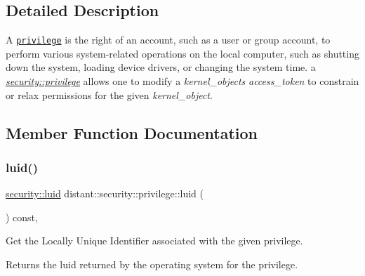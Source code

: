 \subsection{Detailed Description}
A \href{https://msdn.microsoft.com/en-us/library/windows/desktop/aa379306(v=vs.85).aspx}{\tt privilege} is the right of an account, such as a user or group account, to perform various system-\/related operations on the local computer, such as shutting down the system, loading device drivers, or changing the system time. a {\itshape \mbox{\hyperlink{classdistant_1_1security_1_1privilege}{security\+::privilege}}} allows one to modify a {\itshape kernel\+\_\+object\textquotesingle{}s} {\itshape access\+\_\+token} to constrain or relax permissions for the given {\itshape kernel\+\_\+object}. 

\subsection{Member Function Documentation}
\mbox{\label{classdistant_1_1security_1_1privilege_a853ad254c23e6518a259d74e33836040}} 
\subsubsection{\texorpdfstring{luid()}{luid()}}
{\footnotesize\ttfamily \mbox{\hyperlink{structboost_1_1winapi_1_1___l_u_i_d__}{security\+::luid}} distant\+::security\+::privilege\+::luid (\begin{DoxyParamCaption}{ }\end{DoxyParamCaption}) const\hspace{0.3cm}{\ttfamily [inline]}, {\ttfamily [noexcept]}}

Get the Locally Unique Identifier associated with the given privilege. \begin{DoxyReturn}{Returns}
the luid returned by the operating system for the privilege. 
\end{DoxyReturn}
\mbox{\label{classdistant_1_1security_1_1privilege_ab03490c45a7706a1872a8d3aacdf5793}} 
